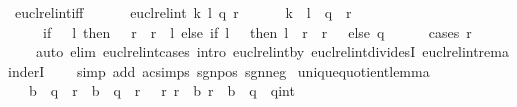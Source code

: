 \begin{isabellebody}
\isanewline
{}\isamarkupfalse%
\ eucl{\isacharunderscore}{\kern0pt}rel{\isacharunderscore}{\kern0pt}int{\isacharunderscore}{\kern0pt}iff{\isacharcolon}{\kern0pt}\ \ \ \ \isanewline
\ \ {\isachardoublequoteopen}eucl{\isacharunderscore}{\kern0pt}rel{\isacharunderscore}{\kern0pt}int\ k\ l\ {\isacharparenleft}{\kern0pt}q{\isacharcomma}{\kern0pt}\ r{\isacharparenright}{\kern0pt}\ {\isasymlongleftrightarrow}\ \isanewline
\ \ \ \ k\ {\isacharequal}{\kern0pt}\ l\ {\isacharasterisk}{\kern0pt}\ q\ {\isacharplus}{\kern0pt}\ r\ {\isasymand}\isanewline
\ \ \ \ \ {\isacharparenleft}{\kern0pt}if\ {}\ {\isacharless}{\kern0pt}\ l\ then\ {}\ {\isasymle}\ r\ {\isasymand}\ r\ {\isacharless}{\kern0pt}\ l\ else\ if\ l\ {\isacharless}{\kern0pt}\ {}\ then\ l\ {\isacharless}{\kern0pt}\ r\ {\isasymand}\ r\ {\isasymle}\ {}\ else\ q\ {\isacharequal}{\kern0pt}\ {}{\isacharparenright}{\kern0pt}{\isachardoublequoteclose}\isanewline
%
\isadelimproof
\ \ %
\endisadelimproof
%
\isatagproof
{}\isamarkupfalse%
\ {\isacharparenleft}{\kern0pt}cases\ {\isachardoublequoteopen}r\ {\isacharequal}{\kern0pt}\ {}{\isachardoublequoteclose}{\isacharparenright}{\kern0pt}\isanewline
\ \ \ \ {\isacharparenleft}{\kern0pt}auto\ elim{\isacharbang}{\kern0pt}{\isacharcolon}{\kern0pt}\ eucl{\isacharunderscore}{\kern0pt}rel{\isacharunderscore}{\kern0pt}int{\isachardot}{\kern0pt}cases\ intro{\isacharcolon}{\kern0pt}\ eucl{\isacharunderscore}{\kern0pt}rel{\isacharunderscore}{\kern0pt}int{\isacharunderscore}{\kern0pt}by{}\ eucl{\isacharunderscore}{\kern0pt}rel{\isacharunderscore}{\kern0pt}int{\isacharunderscore}{\kern0pt}dividesI\ eucl{\isacharunderscore}{\kern0pt}rel{\isacharunderscore}{\kern0pt}int{\isacharunderscore}{\kern0pt}remainderI\isanewline
\ \ \ \ simp\ add{\isacharcolon}{\kern0pt}\ ac{\isacharunderscore}{\kern0pt}simps\ sgn{\isacharunderscore}{\kern0pt}{}{\isacharunderscore}{\kern0pt}pos\ sgn{\isacharunderscore}{\kern0pt}{}{\isacharunderscore}{\kern0pt}neg{\isacharparenright}{\kern0pt}%
\endisatagproof
{\isafoldproof}%
%
\isadelimproof
\isanewline
%
\endisadelimproof
\isanewline
{}\isamarkupfalse%
\ unique{\isacharunderscore}{\kern0pt}quotient{\isacharunderscore}{\kern0pt}lemma{\isacharcolon}{\kern0pt}\isanewline
\ \ \ {\isachardoublequoteopen}b\ {\isacharasterisk}{\kern0pt}\ q{\isacharprime}{\kern0pt}\ {\isacharplus}{\kern0pt}\ r{\isacharprime}{\kern0pt}\ {\isasymle}\ b\ {\isacharasterisk}{\kern0pt}\ q\ {\isacharplus}{\kern0pt}\ r{\isachardoublequoteclose}\ {\isachardoublequoteopen}{}\ {\isasymle}\ r{\isacharprime}{\kern0pt}{\isachardoublequoteclose}\ {\isachardoublequoteopen}r{\isacharprime}{\kern0pt}\ {\isacharless}{\kern0pt}\ b{\isachardoublequoteclose}\ {\isachardoublequoteopen}r\ {\isacharless}{\kern0pt}\ b{\isachardoublequoteclose}\ \ {\isachardoublequoteopen}q{\isacharprime}{\kern0pt}\ {\isasymle}\ {\isacharparenleft}{\kern0pt}q{\isacharcolon}{\kern0pt}{\isacharcolon}{\kern0pt}int{\isacharparenright}{\kern0pt}{\isachardoublequoteclose}\isanewline

\end{isabellebody}
